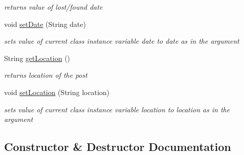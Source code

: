 \begin{DoxyCompactItemize}
\begin{DoxyCompactList}\small\item\em returns value of lost/found date \end{DoxyCompactList}\item 
void \hyperlink{classcom_1_1example_1_1sel_1_1lostfound_1_1UserPost_a97f4bc20fcf5d8b66ab3756acf5fa7ff}{set\+Date} (String date)\hypertarget{classcom_1_1example_1_1sel_1_1lostfound_1_1UserPost_a97f4bc20fcf5d8b66ab3756acf5fa7ff}{}\label{classcom_1_1example_1_1sel_1_1lostfound_1_1UserPost_a97f4bc20fcf5d8b66ab3756acf5fa7ff}

\begin{DoxyCompactList}\small\item\em sets value of current class instance variable date to date as in the argument \end{DoxyCompactList}\item 
String \hyperlink{classcom_1_1example_1_1sel_1_1lostfound_1_1UserPost_ac259d30c11ccbd238a146cac9d6272e7}{get\+Location} ()\hypertarget{classcom_1_1example_1_1sel_1_1lostfound_1_1UserPost_ac259d30c11ccbd238a146cac9d6272e7}{}\label{classcom_1_1example_1_1sel_1_1lostfound_1_1UserPost_ac259d30c11ccbd238a146cac9d6272e7}

\begin{DoxyCompactList}\small\item\em returns location of the post \end{DoxyCompactList}\item 
void \hyperlink{classcom_1_1example_1_1sel_1_1lostfound_1_1UserPost_aef4e23f41ad5b75cf1633cfa0d4b7aa9}{set\+Location} (String location)\hypertarget{classcom_1_1example_1_1sel_1_1lostfound_1_1UserPost_aef4e23f41ad5b75cf1633cfa0d4b7aa9}{}\label{classcom_1_1example_1_1sel_1_1lostfound_1_1UserPost_aef4e23f41ad5b75cf1633cfa0d4b7aa9}

\begin{DoxyCompactList}\small\item\em sets value of current class instance variable location to location as in the argument \end{DoxyCompactList}\end{DoxyCompactItemize}


\subsection{Constructor \& Destructor Documentation}
